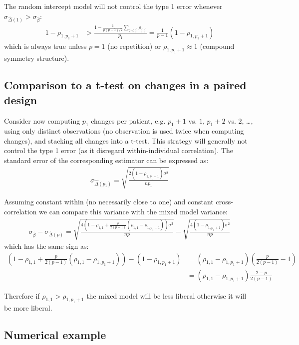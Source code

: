 \documentclass[12pt]{article}
\begin{document}
\noindent The random intercept model will not control the type 1 error
whenever \(\sigma_{\widehat{\Delta}(1)}>\sigma_{\widehat{\beta}}\):
\begin{align*}
1-\rho_{1,p_1+1} &> \frac{1-\frac{1}{p(p-1)/2}\sum_{j < j^{\prime}} \rho_{j,j^{\prime}}}{p_1} = \frac{1}{p-1}(1-\rho_{1,p_1+1})
\end{align*}
which is always true unless \(p=1\) (no repetition) or \(\rho_{1,p_1+1}\approx 1\) (compound symmetry structure).

\subsection{Comparison to a t-test on changes in a paired design}
\label{sec:org89c4efd}

Consider now computing \(p_1\) changes per patient, e.g. \(p_1+1\)
vs. \(1\), \(p_1+2\) vs. \(2\), \ldots, using only distinct
observations (no observation is used twice when computing changes),
and stacking all changes into a t-test. This strategy will generally
not control the type 1 error (as it disregard within-individual
correlation). The standard error of the corresponding estimator can be
expressed as:
\begin{align*}
\sigma_{\widehat{\Delta}(p_1)} = \sqrt{\frac{2(1-\rho_{1,p_1+1}) \sigma^2}{np_1}}
\end{align*}

Assuming constant within (no necessarily close to one) and constant
cross-correlation we can compare this variance with the mixed model
variance:
\begin{align*}
\sigma_{\widehat{\beta}} - \sigma_{\widehat{\Delta}(p)} = \sqrt{\frac{4\left(1-\rho_{1,1} + \frac{p}{2(p-1)}(\rho_{1,1}-\rho_{1,p_1+1})\right) \sigma^2}{n p}} -  \sqrt{\frac{4(1-\rho_{1,p_1+1}) \sigma^2}{np}}
\end{align*}
which has the same sign as:
\begin{align*}
\left(1-\rho_{1,1} + \frac{p}{2(p-1)}(\rho_{1,1}-\rho_{1,p_1+1})\right) - (1-\rho_{1,p_1+1})
& = (\rho_{1,1}-\rho_{1,p_1+1}) \left(\frac{p}{2(p-1)} - 1 \right) \\
& = (\rho_{1,1}-\rho_{1,p_1+1}) \frac{2-p}{2(p-1)} 
\end{align*}

Therefore if \(\rho_{1,1}>\rho_{1,p_1+1}\) the mixed model will be
less liberal otherwise it will be more liberal.

\subsection{Numerical example}
\label{sec:org9a0ab94}
\end{document}
